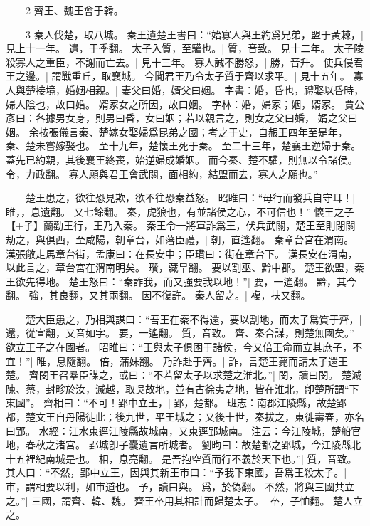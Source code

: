 　　2 齊王、魏王會于韓。


　　3 秦人伐楚，取八城。
	秦王遺楚王書曰：“始寡人與王約爲兄弟，盟于黃棘，|{
	見上十一年。
	遺，于季翻。
}
太子入質，至驩也。|{
	質，音致。
	見十二年。
}
太子陵殺寡人之重臣，不謝而亡去。|{
	見十三年。
}
寡人誠不勝怒，|{
	勝，音升。
}
使兵侵君王之邊。|{
	謂戰重丘，取襄城。
}
今聞君王乃令太子質于齊以求平。|{
	見十五年。
}
寡人與楚接境，婚姻相親。|{
	妻父曰婚，婿父曰姻。
	字書：婚，昏也，禮娶以昏時，婦人陰也，故曰婚。
	婿家女之所因，故曰姻。
	字林：婚，婦家；姻，婿家。
	賈公彥曰：各據男女身，則男曰昏，女曰姻；若以親言之，則女之父曰婚， 婿之父曰姻。
	余按張儀言秦、楚嫁女娶婦爲昆弟之國；考之于史，自赧王四年至是年，秦、楚未嘗嫁娶也。
	至十九年，楚懷王死于秦。
	至二十三年，楚襄王逆婦于秦。
	蓋先已約親，其後襄王終喪，始逆婦成婚姻。
}
而今秦、楚不驩，則無以令諸侯。|{
	令，力政翻。
}
寡人願與君王會武關，面相約，結盟而去，寡人之願也。”

　　楚王患之，欲往恐見欺，欲不往恐秦益怒。
	昭睢曰：“毋行而發兵自守耳！|{
	睢，，息遺翻。
	又七餘翻。
}
秦，虎狼也，有並諸侯之心，不可信也！”
懷王之子【+子】蘭勸王行，王乃入秦。
	秦王令一將軍詐爲王，伏兵武關，楚王至則閉關劫之，與俱西，至咸陽，朝章台，如藩臣禮，|{
	朝，直遙翻。
	秦章台宮在渭南。
	漢張敞走馬章台街，孟康曰：在長安中；臣瓚曰：街在章台下。
	漢長安在渭南，以此言之，章台宮在渭南明矣。
	瓚，藏旱翻。
}
要以割巫、黔中郡。
	楚王欲盟，秦王欲先得地。
	楚王怒曰：“秦詐我，而又強要我以地！”|{
	要，一遙翻。
	黔，其今翻。
	強，其良翻，又其兩翻。
}
因不復許。
	秦人留之。|{
	複，扶又翻。
}

　　楚大臣患之，乃相與謀曰：“吾王在秦不得還，要以割地，而太子爲質于齊，|{
	還，從宣翻，又音如字。
	要，一遙翻。
	質，音致。
}
齊、秦合謀，則楚無國矣。”
欲立王子之在國者。
	昭睢曰：“王與太子俱困于諸侯，今又倍王命而立其庶子，不宜！”|{
	睢，息隨翻。
	倍，蒲妹翻。
}
乃詐赴于齊。|{
	詐，言楚王薨而請太子還王楚。
}
齊閔王召羣臣謀之，或曰：“不若留太子以求楚之淮北。”|{
	閔，讀曰閔。
	楚滅陳、蔡，封畛於汝，滅越，取吳故地，並有古徐夷之地，皆在淮北，卽楚所謂“下東國”。
}
齊相曰：“不可！郢中立王，|{
	郢，楚都。
	班志：南郡江陵縣，故楚郢都，楚文王自丹陽徙此；後九世，平王城之；又後十世，秦拔之，東徙壽春，亦名曰郢。
	水經：江水東逕江陵縣故城南，又東逕郢城南。
	注云：今江陵城，楚船官地，春秋之渚宮。
	郢城卽子囊遺言所城者。
	劉昫曰：故楚都之郢城，今江陵縣北十五裡紀南城是也。
	相，息亮翻。
}
是吾抱空質而行不義於天下也。”|{
	質，音致。
}
其人曰：“不然，郢中立王，因與其新王市曰：“予我下東國，吾爲王殺太子。|{
	巿，謂相要以利，如巿道也。
	予，讀曰與。
	爲，於偽翻。
}
不然，將與三國共立之。”|{
	三國，謂齊、韓、魏。
}
齊王卒用其相計而歸楚太子。|{
	卒，子恤翻。
}
楚人立之。


